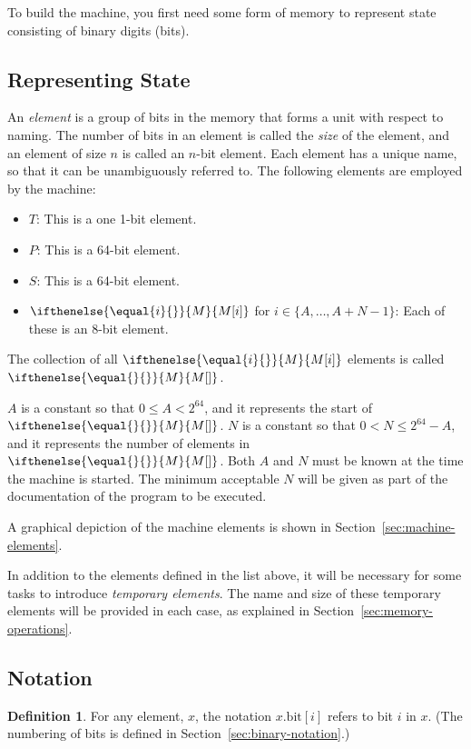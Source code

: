 \documentclass[a4paper,12pt]{article}
\newcommand{\MEM}[1]{\ifthenelse{\equal{#1}{}}{M}{M[#1]}}
\newcommand{\PC}{P}
\newcommand{\SP}{S}
\newcommand{\TERM}{T}
\newcommand{\bitno}[2]{#1.\mathrm{bit}[#2]}
\newcommand{\range}[2]{\{#1,\ldots,#2\}}
\theoremstyle{definition}
\newtheorem{definition}{Definition}
\begin{document}
To build the machine, you first need some form of memory to represent state consisting of binary digits (bits).

\subsection{Representing State}

An \emph{element} is a group of bits in the memory that forms a unit with respect to naming.
The number of bits in an element is called the \emph{size} of the element, and an element of size $n$ is called an $n$-bit element.
Each element has a unique name, so that it can be unambiguously referred to.
The following elements are employed by the machine:
\begin{itemize}
\item $\TERM$: This is a one 1-bit element.
\item $\PC$: This is a 64-bit element.
\item $\SP$: This is a 64-bit element.
\item $\MEM{i}$ for $i \in \range{A}{A+N-1}$: Each of these is an 8-bit element.
\end{itemize}
The collection of all $\MEM{i}$ elements is called $\MEM{}$.

$A$ is a constant so that $0 \le A < 2^{64}$, and it represents the start of $\MEM{}$.
$N$ is a constant so that $0 < N \le 2^{64}-A$, and it represents the number of elements in $\MEM{}$.
Both $A$ and $N$ must be known at the time the machine is started.
The minimum acceptable $N$ will be given as part of the documentation of the program to be executed.

A graphical depiction of the machine elements is shown in Section~\ref{sec:machine-elements}.

In addition to the elements defined in the list above, it will be necessary for some tasks to introduce \emph{temporary elements}.
The name and size of these temporary elements will be provided in each case, as explained in Section~\ref{sec:memory-operations}.

\subsection{Notation}

\begin{definition}
For any element, $x$, the notation $\bitno{x}{i}$ refers to bit $i$ in $x$. (The numbering of bits is defined in Section~\ref{sec:binary-notation}.)
\end{definition}
\end{document}
